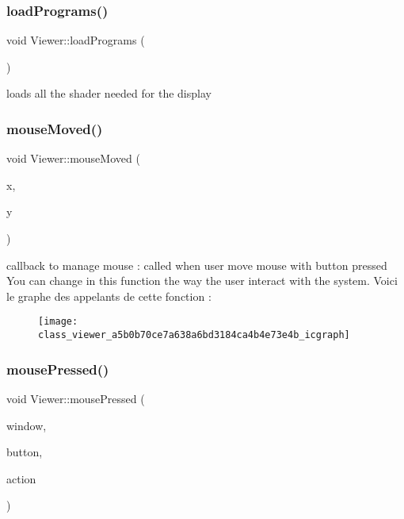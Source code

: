 \subsubsection{\texorpdfstring{load\+Programs()}{loadPrograms()}}
{\footnotesize\ttfamily void Viewer\+::load\+Programs (\begin{DoxyParamCaption}{ }\end{DoxyParamCaption})}



loads all the shader needed for the display 

\mbox{\label{class_viewer_a5b0b70ce7a638a6bd3184ca4b4e73e4b}} 
\subsubsection{\texorpdfstring{mouse\+Moved()}{mouseMoved()}}
{\footnotesize\ttfamily void Viewer\+::mouse\+Moved (\begin{DoxyParamCaption}\item[{int}]{x,  }\item[{int}]{y }\end{DoxyParamCaption})}

callback to manage mouse \+: called when user move mouse with button pressed You can change in this function the way the user interact with the system. Voici le graphe des appelants de cette fonction \+:
\nopagebreak
\begin{figure}[H]
\begin{center}
\leavevmode
\texttt{[image: class\_viewer\_a5b0b70ce7a638a6bd3184ca4b4e73e4b\_icgraph]}
\end{center}
\end{figure}
\mbox{\label{class_viewer_ac2e3964b994ed24680586369b2b7a750}} 
\subsubsection{\texorpdfstring{mouse\+Pressed()}{mousePressed()}}
{\footnotesize\ttfamily void Viewer\+::mouse\+Pressed (\begin{DoxyParamCaption}\item[{G\+L\+F\+Wwindow $\ast$}]{window,  }\item[{int}]{button,  }\item[{int}]{action }\end{DoxyParamCaption})}

